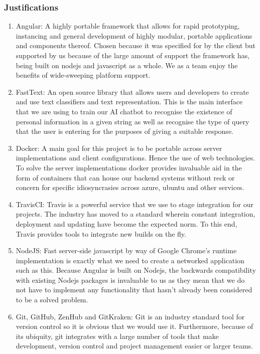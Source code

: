\documentclass[11pt]{article}
\begin{document}
\subsubsection{Justifications}
\begin{enumerate}
	\item Angular: A highly portable framework that allows for rapid prototyping, instancing and general development of highly modular, portable applications and components thereof. Chosen because it was specified for by the client but supported by us because of the large amount of support the framework has, being built on nodejs and javascript as a whole. We as a team enjoy the benefits of wide-sweeping platform support.
	\item FastText: An open source library that allows users and developers to create and use text classifiers and text representation. This is the main interface that we are using to train our AI chatbot to recognise the existence of personal information in a given string as well as recognise the type of query that the user is entering for the purposes of giving a suitable response.
	\item Docker: A main goal for this project is to be portable across server implementations and client configurations. Hence the use of web technologies. To solve the server implementations docker provides invaluable aid in the form of containers that can house our backend systems without reck or concern for specific idiosyncrasies across azure, ubuntu and other services. 
	\item TravisCI: Travis is a powerful service that we use to stage integration for our projects. The industry has moved to a standard wherein constant integration, deployment and updating have become the expected norm. To this end, Travis provides tools to integrate new builds on the fly.
	\item NodeJS: Fast server-side javascript by way of Google Chrome’s runtime implementation is exactly what we need to create a networked application such as this. Because Angular is built on Nodejs, the backwards compatibility with existing Nodejs packages is invaluable to us as they mean that we do not have to implement any functionality that hasn’t already been considered to be a solved problem.
	\item Git, GitHub, ZenHub and GitKraken: Git is an industry standard tool for version control so it is obvious that we would use it. Furthermore, because of its ubiquity, git integrates with a large number of tools that make development, version control and project management easier or larger teams.

\end{enumerate}
\end{document}
